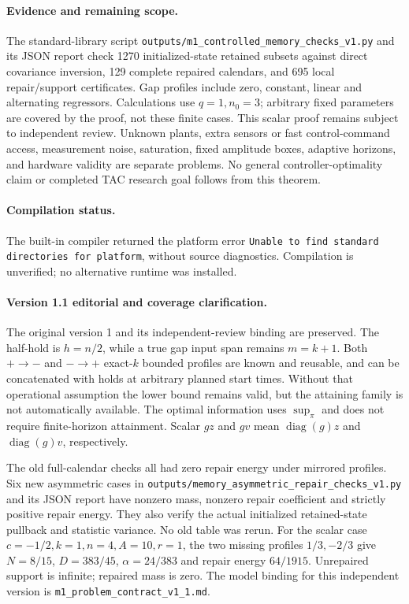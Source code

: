 \documentclass[11pt]{article}
\begin{document}
\paragraph{Evidence and remaining scope.}
The standard-library script
\texttt{outputs/m1\_controlled\_memory\_checks\_v1.py} and its JSON report
check 1270 initialized-state retained subsets against direct covariance
inversion, 129 complete repaired calendars, and 695 local repair/support
certificates. Gap profiles include zero, constant, linear and alternating
regressors. Calculations use $q=1,n_0=3$; arbitrary fixed parameters are
covered by the proof, not these finite cases.
This scalar proof remains subject to independent review.
Unknown plants, extra sensors or fast control-command access, measurement
noise, saturation, fixed amplitude boxes, adaptive horizons, and hardware
validity are separate problems. No general controller-optimality claim
or completed TAC research goal follows from this theorem.
\paragraph{Compilation status.}
The built-in compiler returned the platform error
\texttt{Unable to find standard directories for platform}, without source
diagnostics. Compilation is unverified; no alternative runtime was installed.

\paragraph{Version 1.1 editorial and coverage clarification.}
The original version 1 and its independent-review binding are preserved.
The half-hold is $h=n/2$, while a true gap input span remains $m=k+1$.
Both $+\to-$ and $-\to+$ exact-$k$ bounded profiles are known and reusable,
and can be concatenated with holds at arbitrary planned start times.
Without that operational assumption the lower bound remains valid, but
the attaining family is not automatically available.
The optimal information uses $\sup_\pi$ and does not require finite-horizon
attainment. Scalar $gz$ and $gv$ mean $\operatorname{diag}(g)z$ and
$\operatorname{diag}(g)v$, respectively.

The old full-calendar checks all had zero repair energy under mirrored
profiles. Six new asymmetric cases in
\texttt{outputs/memory\_asymmetric\_repair\_checks\_v1.py}
and its JSON report have nonzero mass, nonzero repair coefficient and
strictly positive repair energy. They also verify the actual initialized
retained-state pullback and statistic variance. No old table was rerun.
For the scalar case $c=-1/2,k=1,n=4,A=10,r=1$, the two missing profiles
$1/3,-2/3$ give $N=8/15$, $D=383/45$, $\alpha=24/383$ and
repair energy $64/1915$. Unrepaired support is infinite; repaired mass is zero.
The model binding for this independent version is
\texttt{m1\_problem\_contract\_v1\_1.md}.
\end{document}

